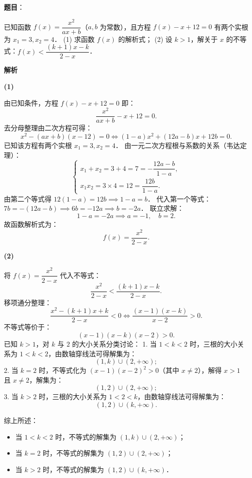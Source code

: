\begin{answer}

\textbf{题目}：

已知函数 $f(x) = \dfrac{x^2}{ax + b}$（$a, b$ 为常数），且方程 $f(x) - x + 12 = 0$ 有两个实根为 $x_1 = 3, x_2 = 4$．
(1) 求函数 $f(x)$ 的解析式；
(2) 设 $k > 1$，解关于 $x$ 的不等式：$f(x) < \dfrac{(k+1)x - k}{2-x}$．

\textbf{解析}

\textbf{(1)}

由已知条件，方程 $f(x) - x + 12 = 0$ 即：
\nopagebreak[4]
\[
\dfrac{x^2}{ax + b} - x + 12 = 0.
\]
去分母整理由二次方程可得：
\nopagebreak[4]
\[
x^2 - (ax + b)(x - 12) = 0 \iff (1 - a)x^2 + (12a - b)x + 12b = 0.
\]
已知该方程有两个实根 $x_1 = 3, x_2 = 4$．
由一元二次方程根与系数的关系（韦达定理）：
\nopagebreak[4]
\[
\begin{cases}
x_1 + x_2 = 3 + 4 = 7 = -\dfrac{12a - b}{1 - a}, \\
x_1 x_2 = 3 \times 4 = 12 = \dfrac{12b}{1 - a}.
\end{cases}
\]
由第二个等式得 $12(1 - a) = 12b \implies 1 - a = b$．
代入第一个等式：$7b = -(12a - b) \implies 6b = -12a \implies b = -2a$．
联立求解：
\nopagebreak[4]
\[
1 - a = -2a \implies a = -1, \quad b = 2.
\]
故函数解析式为：
\nopagebreak[4]
\[
f(x) = \dfrac{x^2}{2 - x}.
\]

\textbf{(2)}

将 $f(x) = \dfrac{x^2}{2 - x}$ 代入不等式：
\nopagebreak[4]
\[
\dfrac{x^2}{2 - x} < \dfrac{(k+1)x - k}{2 - x}.
\]
移项通分整理：
\nopagebreak[4]
\[
\dfrac{x^2 - (k+1)x + k}{2 - x} < 0 \iff \dfrac{(x - 1)(x - k)}{x - 2} > 0.
\]
不等式等价于：
\nopagebreak[4]
\[
(x - 1)(x - k)(x - 2) > 0.
\]
已知 $k > 1$，对 $k$ 与 $2$ 的大小关系分类讨论：
1. 当 $1 < k < 2$ 时，三根的大小关系为 $1 < k < 2$，由数轴穿线法可得解集为：
\nopagebreak[4]
\[
(1, k) \cup (2, +\infty);
\]
2. 当 $k = 2$ 时，不等式化为 $(x - 1)(x - 2)^2 > 0$（其中 $x \neq 2$），解得 $x > 1$ 且 $x \neq 2$，解集为：
\nopagebreak[4]
\[
(1, 2) \cup (2, +\infty);
\]
3. 当 $k > 2$ 时，三根的大小关系为 $1 < 2 < k$，由数轴穿线法可得解集为：
\nopagebreak[4]
\[
(1, 2) \cup (k, +\infty).
\]

综上所述：
\begin{itemize}
\item 当 $1 < k < 2$ 时，不等式的解集为 $(1, k) \cup (2, +\infty)$；
\item 当 $k = 2$ 时，不等式的解集为 $(1, 2) \cup (2, +\infty)$；
\item 当 $k > 2$ 时，不等式的解集为 $(1, 2) \cup (k, +\infty)$．
\end{itemize}


\end{answer}

